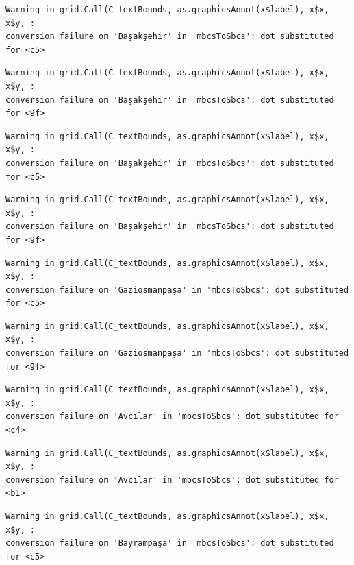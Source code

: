 \documentclass[
  11pt,
  a4paper,
  DIV=11,
  numbers=noendperiod]{scrartcl}
\begin{document}
\begin{verbatim}
Warning in grid.Call(C_textBounds, as.graphicsAnnot(x$label), x$x, x$y, :
conversion failure on 'Başakşehir' in 'mbcsToSbcs': dot substituted for <c5>
\end{verbatim}

\begin{verbatim}
Warning in grid.Call(C_textBounds, as.graphicsAnnot(x$label), x$x, x$y, :
conversion failure on 'Başakşehir' in 'mbcsToSbcs': dot substituted for <9f>
\end{verbatim}

\begin{verbatim}
Warning in grid.Call(C_textBounds, as.graphicsAnnot(x$label), x$x, x$y, :
conversion failure on 'Başakşehir' in 'mbcsToSbcs': dot substituted for <c5>
\end{verbatim}

\begin{verbatim}
Warning in grid.Call(C_textBounds, as.graphicsAnnot(x$label), x$x, x$y, :
conversion failure on 'Başakşehir' in 'mbcsToSbcs': dot substituted for <9f>
\end{verbatim}

\begin{verbatim}
Warning in grid.Call(C_textBounds, as.graphicsAnnot(x$label), x$x, x$y, :
conversion failure on 'Gaziosmanpaşa' in 'mbcsToSbcs': dot substituted for <c5>
\end{verbatim}

\begin{verbatim}
Warning in grid.Call(C_textBounds, as.graphicsAnnot(x$label), x$x, x$y, :
conversion failure on 'Gaziosmanpaşa' in 'mbcsToSbcs': dot substituted for <9f>
\end{verbatim}

\begin{verbatim}
Warning in grid.Call(C_textBounds, as.graphicsAnnot(x$label), x$x, x$y, :
conversion failure on 'Avcılar' in 'mbcsToSbcs': dot substituted for <c4>
\end{verbatim}

\begin{verbatim}
Warning in grid.Call(C_textBounds, as.graphicsAnnot(x$label), x$x, x$y, :
conversion failure on 'Avcılar' in 'mbcsToSbcs': dot substituted for <b1>
\end{verbatim}

\begin{verbatim}
Warning in grid.Call(C_textBounds, as.graphicsAnnot(x$label), x$x, x$y, :
conversion failure on 'Bayrampaşa' in 'mbcsToSbcs': dot substituted for <c5>
\end{verbatim}
\end{document}
